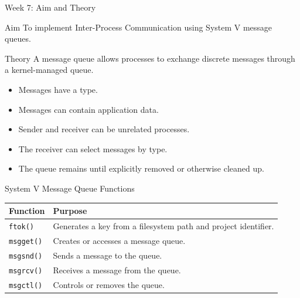 \documentclass[aspectratio=169,10pt]{beamer}
\begin{document}
\begin{frame}{Week 7: Aim and Theory}

\begin{block}{Aim}
To implement Inter-Process Communication
using System V message queues.
\end{block}

\begin{block}{Theory}
A message queue allows processes to exchange
discrete messages through a kernel-managed queue.
\end{block}

\begin{itemize}
    \item Messages have a type.
    \item Messages can contain application data.
    \item Sender and receiver can be unrelated processes.
    \item The receiver can select messages by type.
    \item The queue remains until explicitly removed
    or otherwise cleaned up.
\end{itemize}

\end{frame}

\begin{frame}{System V Message Queue Functions}

\begin{center}
\begin{tabular}{p{3cm}p{8cm}}
\toprule
\textbf{Function} & \textbf{Purpose}\\
\midrule
\texttt{ftok()} &
Generates a key from a filesystem path and project identifier.\\
\addlinespace
\texttt{msgget()} &
Creates or accesses a message queue.\\
\addlinespace
\texttt{msgsnd()} &
Sends a message to the queue.\\
\addlinespace
\texttt{msgrcv()} &
Receives a message from the queue.\\
\addlinespace
\texttt{msgctl()} &
Controls or removes the queue.\\
\bottomrule
\end{tabular}
\end{center}

\end{frame}
\end{document}
